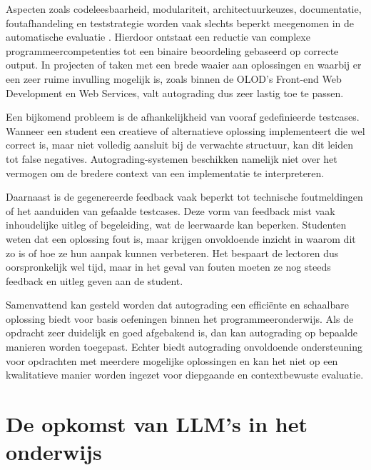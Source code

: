 \vspace{1em}

Aspecten zoals codeleesbaarheid, modulariteit, architectuurkeuzes, documentatie, foutafhandeling en teststrategie worden vaak slechts beperkt meegenomen in de automatische evaluatie \autocite{Messer2024}. Hierdoor ontstaat een reductie van complexe programmeercompetenties tot een binaire beoordeling gebaseerd op correcte output. In projecten of taken met een brede waaier aan oplossingen en waarbij er een zeer ruime invulling mogelijk is, zoals binnen de OLOD's Front-end Web Development en Web Services, valt autograding dus zeer lastig toe te passen.

\vspace{1em}

Een bijkomend probleem is de afhankelijkheid van vooraf gedefinieerde testcases. Wanneer een student een creatieve of alternatieve oplossing implementeert die wel correct is, maar niet volledig aansluit bij de verwachte structuur, kan dit leiden tot false negatives. Autograding-systemen beschikken namelijk niet over het vermogen om de bredere context van een implementatie te interpreteren.

\vspace{1em}

Daarnaast is de gegenereerde feedback vaak beperkt tot technische foutmeldingen of het aanduiden van gefaalde testcases. Deze vorm van feedback mist vaak inhoudelijke uitleg of begeleiding, wat de leerwaarde kan beperken. Studenten weten dat een oplossing fout is, maar krijgen onvoldoende inzicht in waarom dit zo is of hoe ze hun aanpak kunnen verbeteren. Het bespaart de lectoren dus oorspronkelijk wel tijd, maar in het geval van fouten moeten ze nog steeds feedback en uitleg geven aan de student.

\vspace{1em}

Samenvattend kan gesteld worden dat autograding een efficiënte en schaalbare oplossing biedt voor basis oefeningen binnen het programmeeronderwijs. Als de opdracht zeer duidelijk en goed afgebakend is, dan kan autograding op bepaalde manieren worden toegepast. Echter biedt autograding onvoldoende ondersteuning voor opdrachten met meerdere mogelijke oplossingen en kan het niet op een kwalitatieve manier worden ingezet voor diepgaande en contextbewuste evaluatie. 


\section{De opkomst van LLM's in het onderwijs}
\label{ch:llm-opkomst}

